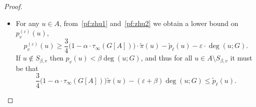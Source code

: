 \documentclass{report}
\newcommand{\1}{\mathbf{1}}
\newcommand{\wt}[1]{\widetilde{#1}}
\theoremstyle{alden}
\theoremstyle{aldenthm}
\theoremstyle{definition}
\theoremstyle{remark}
\begin{document}
\begin{proof}
\begin{itemize}
		\item For any $u \in A$, from~\eqref{pf:zhu1} and~\eqref{pf:zhu2} we obtain a lower bound on $p_v^{(\varepsilon)}(u)$,
		\begin{equation*}
		p_v^{(\varepsilon)}(u) \geq \frac{3}{4}\bigl(1 - \alpha \cdot \tau_{\infty}(G[A])\bigr) \cdot \wt{\pi}(u) - \wt{p}_{\ell}(u) - \varepsilon \cdot \deg(u;G).
		\end{equation*}
		If $u \not\in S_{\beta,v}$ then $p_v(u) < \beta \deg(u;G)$, and thus for all $u \in A \setminus S_{\beta,v}$ it must be that
		\begin{equation}
		\label{pf:zhu4}
		\frac{3}{4}\bigl(1 - \alpha \cdot \tau_{\infty}(G[A])\bigr)\wt{\pi}(u) - (\varepsilon + \beta)\deg(u;G) \leq \wt{p}_{\ell}(u).
		\end{equation}


\end{itemize}
\end{proof}
\end{document}
